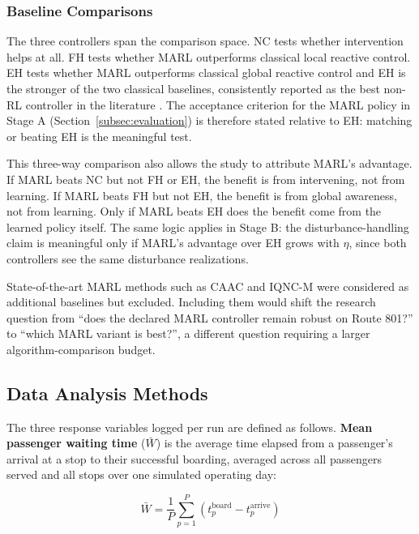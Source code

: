 \subsubsection{Baseline Comparisons}

The three controllers span the comparison space. NC tests whether intervention helps at all. FH tests whether MARL outperforms classical local reactive control. EH tests whether MARL outperforms classical global reactive control and EH is the stronger of the two classical baselines, consistently reported as the best non-RL controller in the literature \cite{Wangsun,Rodriguez2023Cooperative}. The acceptance criterion for the MARL policy in Stage A (Section~\ref{subsec:evaluation}) is therefore stated relative to EH: matching or beating EH is the meaningful test.

This three-way comparison also allows the study to attribute MARL's advantage. If MARL beats NC but not FH or EH, the benefit is from intervening, not from learning. If MARL beats FH but not EH, the benefit is from global awareness, not from learning. Only if MARL beats EH does the benefit come from the learned policy itself. The same logic applies in Stage B: the disturbance-handling claim is meaningful only if MARL's advantage over EH grows with $\eta$, since both controllers see the same disturbance realizations.

State-of-the-art MARL methods such as CAAC and IQNC-M \cite{Wangsun} were considered as additional baselines but excluded. Including them would shift the research question from ``does the declared MARL controller remain robust on Route 801?'' to ``which MARL variant is best?'', a different question requiring a larger algorithm-comparison budget.

\subsection{Data Analysis Methods}

The three response variables logged per run are defined as follows. \textbf{Mean passenger waiting time} ($\bar{W}$) is the average time elapsed from a passenger's arrival at a stop to their successful boarding, averaged across all passengers served and all stops over one simulated operating day:

\begin{equation}
\bar{W} = \frac{1}{P} \sum_{p=1}^{P} \left(t_p^{\text{board}} - t_p^{\text{arrive}}\right)
\label{eq:waiting_time}
\end{equation}

